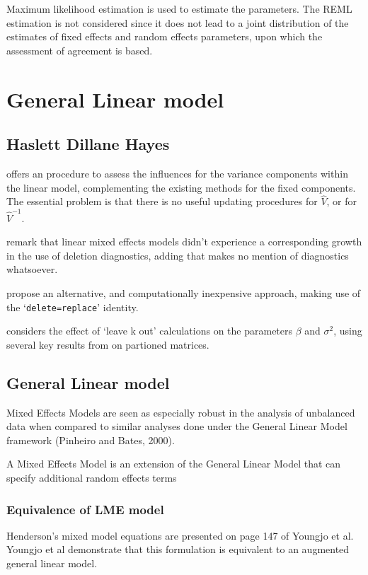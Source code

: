 \documentclass[Main.tex]{subfiles}
\begin{document}
	Maximum likelihood estimation is used to estimate the parameters.
	The REML estimation is not considered since it does not lead to a
	joint distribution of the estimates of fixed effects and random
	effects parameters, upon which the assessment of agreement is
	based.

\chapter{General Linear model}
\section{Haslett Dillane Hayes}
\citet{HaslettDillane} offers an procedure to assess the influences for the variance components
within the linear model, complementing the existing methods for the fixed components. The essential problem is that there is no useful updating procedures for $\hat{V}$, or for $\hat{V}^{-1}$.

\citet{HaslettDillane} remark that linear mixed effects models
didn't experience a corresponding growth in the use of deletion
diagnostics, adding that \citet{McCullSearle} makes no mention of
diagnostics whatsoever.	

\citet{HaslettDillane} propose an alternative, and
computationally inexpensive approach, making use of the
`\texttt{delete=replace}' identity.

\citet{Haslett99} considers the effect of `leave k out'
calculations on the parameters $\beta$ and $\sigma^{2}$, using
several key results from \citet{HaslettHayes} on partioned
matrices.
\section{General Linear model} Mixed Effects Models are seen as
especially robust in the analysis of unbalanced data when compared
to similar analyses done under the General Linear Model framework
(Pinheiro and Bates, 2000).

A Mixed Effects Model is an extension of the General Linear Model
that can specify additional random effects terms




\subsection{Equivalence of LME model}
Henderson's mixed model equations are presented on page 147 of
Youngjo et al. Youngjo et al demonstrate that this formulation is
equivalent to an augmented general linear model.
\end{document}
